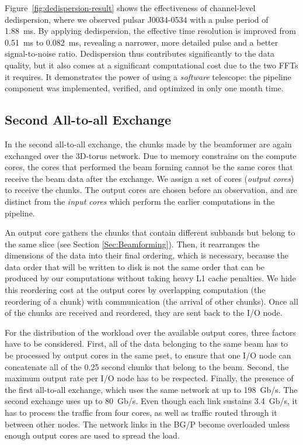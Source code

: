 \documentclass{llncs}
\begin{document}
Figure~\ref{fig:dedispersion-result} shows the effectiveness of channel-level dedispersion, where we observed pulsar J0034-0534 with a pulse period of 1.88~ms. By applying dedispersion, the effective time resolution is improved from 0.51~ms to 0.082~ms, revealing a narrower, more detailed pulse and a better signal-to-noise ratio. Dedispersion thus contributes significantly to the data quality, but it also comes at a significant computational cost due to the two FFTs it requires. It demonstrates the power of using a \emph{software\/} telescope: the pipeline component was implemented, verified, and optimized in only one month time.

\subsection{Second All-to-all Exchange}

In the second all-to-all exchange, the chunks made by the beamformer are again exchanged over the 3D-torus network. Due to memory constrains on the compute cores, the cores that performed the beam forming cannot be the same cores that receive the beam data after the exchange. We assign a set of cores (\emph{output cores}) to receive the chunks. The output cores are chosen before an observation, and are distinct from the \emph{input cores} which perform the earlier computations in the pipeline.

An output core gathers the chunks that contain different subbands but belong to the same slice (see Section \ref{Sec:Beamforming}). Then, it rearranges the dimensions of the data into their final ordering, which is necessary, because the data order that will be written to disk is not the same order that can be produced by our computations without taking heavy L1 cache penalties. We hide this reordering cost at the output cores by overlapping computation (the reordering of a chunk) with communication (the arrival of other chunks). Once all of the chunks are received and reordered, they are sent back to the I/O node.

For the distribution of the workload over the available output cores, three factors have to be considered. First, all of the data belonging to the same beam has to be processed by output cores in the same pset, to ensure that one I/O node can concatenate all of the 0.25 second chunks that belong to the beam. Second, the maximum output rate per I/O node has to be respected. Finally, the presence of the first all-to-all exchange, which uses the same network at up to 198~Gb/s. The second exchange uses up to 80~Gb/s. Even though each link sustains 3.4~Gb/s, it has to process the traffic from four cores, as well as traffic routed through it between other nodes. The network links in the BG/P become overloaded unless enough output cores are used to spread the load.
\end{document}

